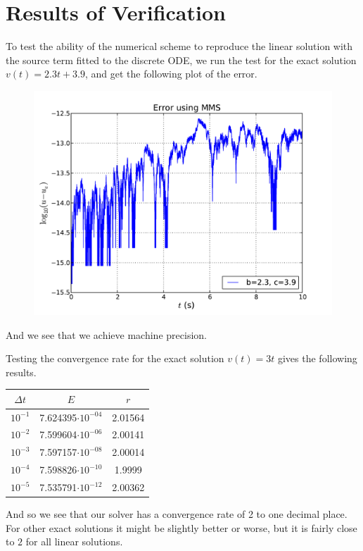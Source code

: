 \documentclass[a4paper, 11pt, notitlepage, english]{article}
\begin{document}
\clearpage 

\section*{Results of Verification}
To test the ability of the numerical scheme to reproduce the linear solution with the source term fitted to the discrete ODE, we run the test for the exact solution $v(t)=2.3t + 3.9$, and get the following plot of the error.

\begin{figure}[htbp]
\centering
\includegraphics[width=\textwidth]{errorplot}
\end{figure}

And we see that we achieve machine precision.

Testing the convergence rate for the exact solution $v(t)=3t$ gives the following results.
\begin{center}
\begin{tabular}{c |c| c}
$\Delta t$ & $E$ & $r$ \\
\hline
$10^{-1}$ & 7.624395$\cdot10^{-04}$&  2.01564 \\
$10^{-2}$ &7.599604$\cdot10^{-06}$&  2.00141 \\
$10^{-3}$ &7.597157$\cdot10^{-08}$&  2.00014 \\
$10^{-4}$ &7.598826$\cdot10^{-10}$&  1.9999 \\
$10^{-5}$  & 7.535791$\cdot10^{-12}$&  2.00362
\end{tabular}
\end{center}
And so we see that our solver has a convergence rate of 2 to one decimal place. For other exact solutions it might be slightly better or worse, but it is fairly close to $2$ for all linear solutions.
\end{document}
